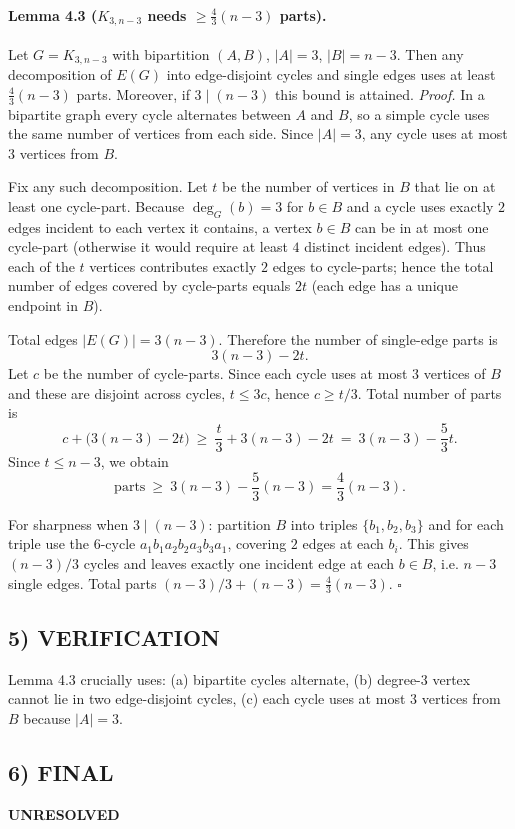 \paragraph{Lemma 4.3 ($K_{3,n-3}$ needs $\ge \frac43(n-3)$ parts).}
Let $G=K_{3,n-3}$ with bipartition $(A,B)$, $|A|=3$, $|B|=n-3$. Then any decomposition of $E(G)$ into edge-disjoint cycles and single edges
uses at least $\frac43(n-3)$ parts. Moreover, if $3\mid (n-3)$ this bound is attained.
\textit{Proof.}
In a bipartite graph every cycle alternates between $A$ and $B$, so a simple cycle uses the same number of vertices from each side.
Since $|A|=3$, any cycle uses at most $3$ vertices from $B$.

Fix any such decomposition. Let $t$ be the number of vertices in $B$ that lie on at least one cycle-part. Because $\deg_G(b)=3$ for $b\in B$ and
a cycle uses exactly $2$ edges incident to each vertex it contains, a vertex $b\in B$ can be in at most one cycle-part (otherwise it would require
at least $4$ distinct incident edges). Thus each of the $t$ vertices contributes exactly $2$ edges to cycle-parts; hence the total number of edges
covered by cycle-parts equals $2t$ (each edge has a unique endpoint in $B$).

Total edges $|E(G)|=3(n-3)$. Therefore the number of single-edge parts is
\[
3(n-3)-2t.
\]
Let $c$ be the number of cycle-parts. Since each cycle uses at most $3$ vertices of $B$ and these are disjoint across cycles, $t\le 3c$, hence $c\ge t/3$.
Total number of parts is
\[
c+\bigl(3(n-3)-2t\bigr)\ \ge\ \frac{t}{3}+3(n-3)-2t\ =\ 3(n-3)-\frac53 t.
\]
Since $t\le n-3$, we obtain
\[
\text{parts}\ \ge\ 3(n-3)-\frac53 (n-3)=\frac43(n-3).
\]

For sharpness when $3\mid(n-3)$: partition $B$ into triples $\{b_1,b_2,b_3\}$ and for each triple use the $6$-cycle
$a_1b_1a_2b_2a_3b_3a_1$, covering $2$ edges at each $b_i$. This gives $(n-3)/3$ cycles and leaves exactly one incident edge at each $b\in B$,
i.e. $n-3$ single edges. Total parts $(n-3)/3+(n-3)=\frac43(n-3)$. \hfill$\square$

\subsection*{5) VERIFICATION}
Lemma 4.3 crucially uses: (a) bipartite cycles alternate, (b) degree-$3$ vertex cannot lie in two edge-disjoint cycles,
(c) each cycle uses at most $3$ vertices from $B$ because $|A|=3$.

\subsection*{6) FINAL}
\textbf{UNRESOLVED}

